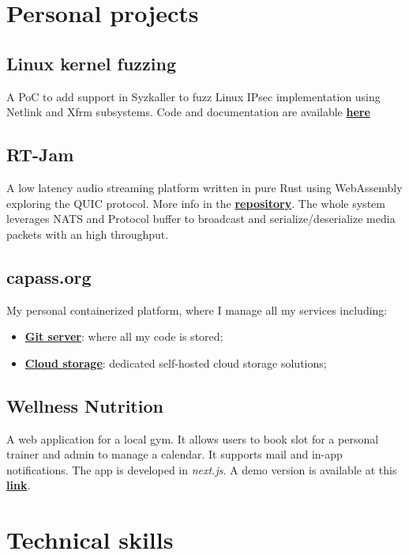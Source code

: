 \documentclass[11pt,a4paper]{article}
\begin{document}
  \section{Personal projects}
  \subsection{Linux kernel fuzzing} A PoC to add support in Syzkaller to fuzz Linux IPsec implementation
  using Netlink and Xfrm subsystems. Code and documentation are available \href{https://github.com/alarmfox/progetto-software-security}{\textbf{here}}

  \subsection{RT-Jam} A low latency audio streaming platform written in pure Rust using WebAssembly exploring 
  the QUIC protocol. More info in the \href{https://github.com/alarmfox/rt-jam}{\textbf{repository}}. The whole system leverages 
  NATS and Protocol buffer to broadcast and serialize/deserialize media packets with an high 
  throughput.
  \subsection{capass.org}
  My personal containerized platform, where I manage all my services including:
  \begin{itemize}
    \item \href{https://git.capass.org}{\textbf{Git server}}: where all my code is stored;
    \item \href{https://cloud.capass.org}{\textbf{Cloud storage}}: dedicated self-hosted cloud storage solutions;
  \end{itemize}

  \subsection{Wellness Nutrition}
  A web application for a local gym. It allows users to book slot for a personal trainer and admin to manage a calendar. It supports mail and in-app notifications. The app is developed in  \textit{next.js}. A demo version is available at this \href{https://wellnessdemo.capass.org}{\textbf{link}}.\\

  \section{Technical skills}
\end{document}
